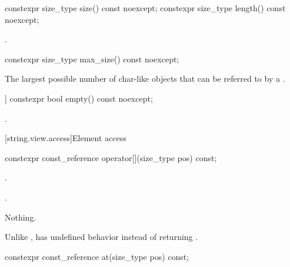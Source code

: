 %
%
\begin{itemdecl}
constexpr size_type size() const noexcept;
constexpr size_type length() const noexcept;
\end{itemdecl}

\begin{itemdescr}
\pnum
\returns
{}.
\end{itemdescr}


%
\begin{itemdecl}
constexpr size_type max_size() const noexcept;
\end{itemdecl}

\begin{itemdescr}
\pnum
\returns
The largest possible number of char-like objects that can be referred to by a .
\end{itemdescr}

%
\begin{itemdecl}
[[nodiscard]] constexpr bool empty() const noexcept;
\end{itemdecl}

\begin{itemdescr}
\pnum
\returns
{}.
\end{itemdescr}

[string.view.access]{Element access}

%
\begin{itemdecl}
constexpr const_reference operator[](size_type pos) const;
\end{itemdecl}

\begin{itemdescr}
\pnum
\expects
{}.

\pnum
\returns
{}.

\pnum
\throws
Nothing.

\pnum
\begin{note}
Unlike ,
 has undefined behavior instead of returning .
\end{note}
\end{itemdescr}

%
\begin{itemdecl}
constexpr const_reference at(size_type pos) const;
\end{itemdecl}

